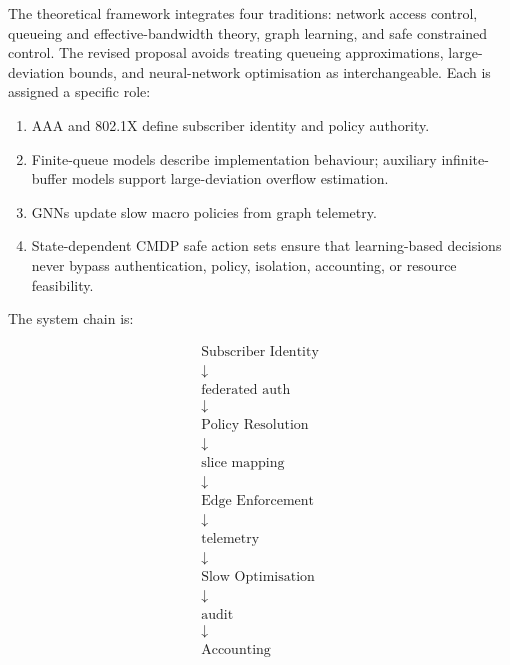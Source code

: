The theoretical framework integrates four traditions: network access control, queueing and effective-bandwidth theory, graph learning, and safe constrained control. The revised proposal avoids treating queueing approximations, large-deviation bounds, and neural-network optimisation as interchangeable. Each is assigned a specific role:

\begin{enumerate}
  \item AAA and 802.1X define subscriber identity and policy authority.
  \item Finite-queue models describe implementation behaviour; auxiliary infinite-buffer models support large-deviation overflow estimation.
  \item GNNs update slow macro policies from graph telemetry.
  \item State-dependent CMDP safe action sets ensure that learning-based decisions never bypass authentication, policy, isolation, accounting, or resource feasibility.
\end{enumerate}

The system chain is:

\vspace{0.75em}
\begin{equation}
  \begin{array}{c}
    \boxed{\text{Subscriber Identity}} \\
    \downarrow \\[-0.2ex]
    \scriptstyle{\text{federated auth}} \\[0.6ex]
    \downarrow \\[-0.2ex]
    \boxed{\text{Policy Resolution}} \\
    \downarrow \\[-0.2ex]
    \scriptstyle{\text{slice mapping}} \\[0.6ex]
    \downarrow \\[-0.2ex]
    \boxed{\text{Edge Enforcement}} \\
    \downarrow \\[-0.2ex]
    \scriptstyle{\text{telemetry}} \\[0.6ex]
    \downarrow \\[-0.2ex]
    \boxed{\text{Slow Optimisation}} \\
    \downarrow \\[-0.2ex]
    \scriptstyle{\text{audit}} \\[0.6ex]
    \downarrow \\[-0.2ex]
    \boxed{\text{Accounting}}
  \end{array}
  \label{eq:theory-chain}
\end{equation}
